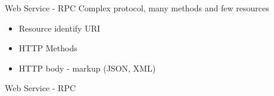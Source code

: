 \begin{frame}{Web Service - RPC}
    Complex protocol, many methods and few resources
    \newline
    \begin{itemize}
      \item Resource identify URI
      \item HTTP Methods
      \item HTTP body - markup (JSON, XML)
    \end{itemize}
\end{frame}


\begin{frame}{Web Service - RPC}
  \begin{center}
    
  \end{center}
\end{frame}
